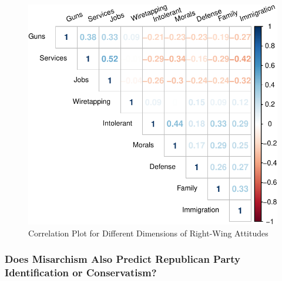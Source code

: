 \documentclass[12pt,]{article}
\begin{document}
\begin{figure}[htbp]
\centering
\includegraphics{figures/descriptives-1.pdf}
\caption{Correlation Plot for Different Dimensions of Right-Wing Attitudes}
\end{figure}


\clearpage

\subsubsection{Does Misarchism Also Predict Republican Party Identification or Conservatism?}\label{alternative-dvs}
\end{document}
